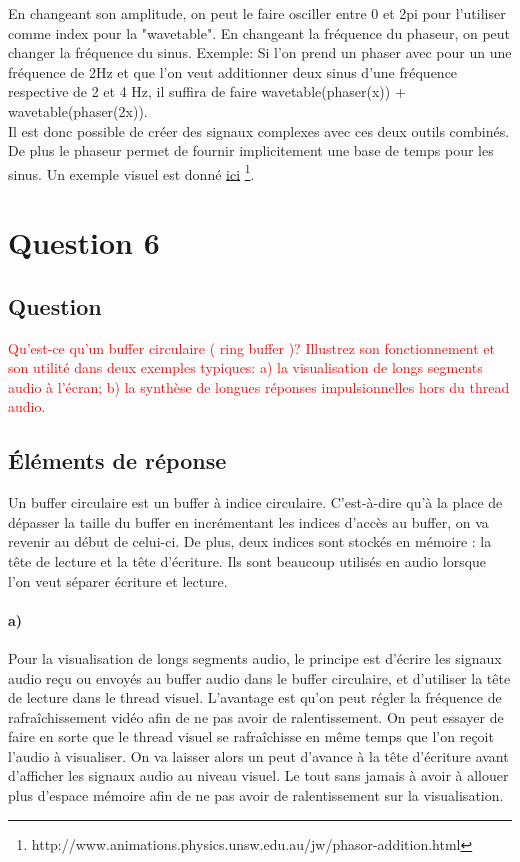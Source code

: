 \documentclass[letterpaper, 12pt]{article}
\newcommand{\alinea}{
\hspace*{0.5cm}}
\newcommand{\red}[1]{
	\textcolor{red}{#1}}
\begin{document}
			\alinea En changeant son amplitude, on peut le faire osciller entre 0 et 2pi pour l'utiliser comme index pour la "wavetable".
				En changeant la fréquence du phaseur, on peut changer la fréquence du sinus. Exemple: Si l'on prend un phaser avec pour un
				une fréquence de 2Hz et que l'on veut additionner deux sinus d'une fréquence respective de 2 et 4 Hz, il suffira de faire
				wavetable(phaser(x)) + wavetable(phaser(2x)).
			~\\
			\alinea Il est donc possible de créer des signaux complexes avec ces deux outils combinés. De plus le phaseur permet de fournir
				implicitement une base de temps pour les sinus. Un exemple visuel est donné 
				\href{http://www.animations.physics.unsw.edu.au/jw/phasor-addition.html}{ici}%
				\footnote{http://www.animations.physics.unsw.edu.au/jw/phasor-addition.html}.
	\section{Question 6}
		\subsection{Question}
			\alinea \red{Qu’est-ce qu’un buffer circulaire ( ring buffer )? Illustrez son fonctionnement et son utilité dans deux exemples
				typiques: a) la visualisation de longs segments audio à l’écran; b) la synthèse de longues réponses impulsionnelles 
				hors du thread audio.}
		\subsection{\'Eléments de réponse}
			\alinea Un buffer circulaire est un buffer à indice circulaire. C'est-à-dire qu'à la place de dépasser la taille du buffer
				en incrémentant les indices d'accès au buffer, on va revenir au début de celui-ci. De plus, deux indices sont stockés
				en mémoire : la tête de lecture et la tête d'écriture. Ils sont beaucoup utilisés en audio lorsque l'on veut séparer
				écriture et lecture.
			\paragraph{a)} Pour la visualisation de longs segments audio, le principe est d'écrire les signaux audio reçu ou envoyés
				au buffer audio dans le buffer circulaire, et d'utiliser la tête de lecture dans le thread visuel. L'avantage est qu'on
				peut régler la fréquence de rafraîchissement vidéo afin de ne pas avoir de ralentissement. On peut essayer de faire
				en sorte que le thread visuel se rafraîchisse en même temps que l'on reçoit l'audio à visualiser. On va laisser alors un
				peut d'avance à la tête d'écriture avant d'afficher les signaux audio au niveau visuel. Le tout sans jamais à avoir à 
				allouer plus d'espace mémoire afin de ne pas avoir de ralentissement sur la visualisation.
\end{document}
